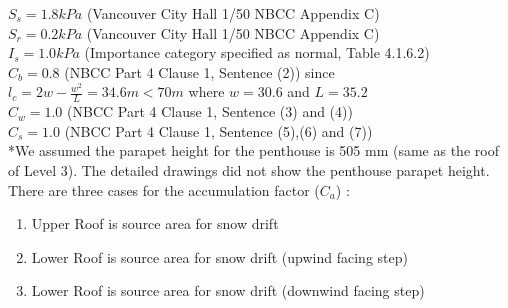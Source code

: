 \documentclass[12pt]{article}
\begin{document}
$S_{s} = 1.8 kPa$ (Vancouver City Hall 1/50 NBCC Appendix C)\\
$S_{r} = 0.2 kPa$ (Vancouver City Hall 1/50 NBCC Appendix C)\\
$I_{s} = 1.0 kPa$ (Importance category specified as normal, Table 4.1.6.2)\\
$C_{b} = 0.8$ (NBCC Part 4 Clause 1, Sentence (2)) since $l_{c}=2w-\frac{w^2}{L}=34.6m < 70m$ where $w=30.6$ and $L = 35.2$\\
$C_{w} = 1.0$ (NBCC Part 4 Clause 1, Sentence (3) and (4))\\
$C_{s} = 1.0$ (NBCC Part 4 Clause 1, Sentence (5),(6) and (7))\\

*We assumed the parapet height for the penthouse is 505 mm (same as the roof of Level 3). The detailed drawings did not show the penthouse parapet height.\\

There are three cases for the accumulation factor ($C_{a}$) :
\begin{enumerate}
\item Upper Roof is source area for snow drift
\item Lower Roof is source area for snow drift (upwind facing step)
\item Lower Roof is source area for snow drift (downwind facing step)
\end{enumerate}
\end{document}
